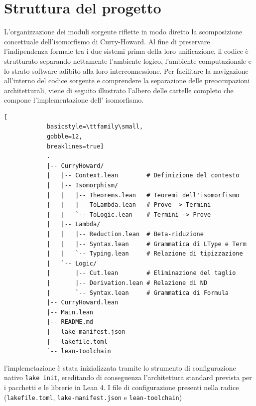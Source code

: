 \section{Struttura del progetto}
L'organizzazione dei moduli sorgente riflette in modo diretto la scomposizione concettuale dell'isomorfismo di Curry-Howard. Al fine di preservare 
l'indipendenza formale tra i due sistemi prima della loro unificazione, il codice è strutturato separando nettamente l'ambiente logico, l'ambiente 
computazionale e lo strato software adibito alla loro interconnessione. Per facilitare la navigazione all'interno del codice sorgente e comprendere 
la separazione delle preoccupazioni architetturali, viene di seguito illustrato l'albero delle cartelle completo che compone l'implementazione dell'
isomorfismo.

\begin{center}
    \begin{minipage}{\textwidth}
        \begin{lstlisting}[
            basicstyle=\ttfamily\small, 
            gobble=12, 
            breaklines=true]
            .
            |-- CurryHoward/
            |   |-- Context.lean        # Definizione del contesto
            |   |-- Isomorphism/        
            |   |   |-- Theorems.lean   # Teoremi dell'isomorfismo
            |   |   |-- ToLambda.lean   # Prove -> Termini
            |   |   `-- ToLogic.lean    # Termini -> Prove
            |   |-- Lambda/
            |   |   |-- Reduction.lean  # Beta-riduzione
            |   |   |-- Syntax.lean     # Grammatica di LType e Term
            |   |   `-- Typing.lean     # Relazione di tipizzazione
            |   `-- Logic/
            |       |-- Cut.lean        # Eliminazione del taglio
            |       |-- Derivation.lean # Relazione di ND
            |       `-- Syntax.lean     # Grammatica di Formula
            |-- CurryHoward.lean
            |-- Main.lean             
            |-- README.md    
            |-- lake-manifest.json
            |-- lakefile.toml
            `-- lean-toolchain
        \end{lstlisting}
    \end{minipage}
\end{center}
l'implemetazione è stata inizializzata tramite lo strumento di configurazione nativo \texttt{lake init}, ereditando di conseguenza l'architettura standard prevista 
per i pacchetti e le librerie in Lean 4. I file di configurazione presenti nella radice (\texttt{lakefile.toml}, \texttt{lake-manifest.json} e \texttt{lean-toolchain}) 
